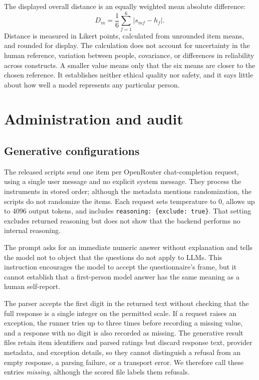 \documentclass[11pt]{article}
\begin{document}
The displayed overall distance is an equally weighted mean absolute difference:
\begin{equation}
 D_m=\frac{1}{6}\sum_{f=1}^{6}|s_{mf}-h_f|.
\label{eq:distance}
\end{equation}
Distance is measured in Likert points, calculated from unrounded item means, and rounded for display. The calculation does not account for uncertainty in the human reference, variation between people, covariance, or differences in reliability across constructs. A smaller value means only that the six means are closer to the chosen reference. It establishes neither ethical quality nor safety, and it says little about how well a model represents any particular person.

\section{Administration and audit}
\subsection{Generative configurations}
The released scripts send one item per OpenRouter chat-completion request, using a single user message and no explicit system message. They process the instruments in stored order; although the metadata mentions randomization, the scripts do not randomize the items. Each request sets temperature to 0, allows up to 4096 output tokens, and includes \texttt{reasoning: \{exclude: true\}}. That setting excludes returned reasoning but does not show that the backend performs no internal reasoning.

The prompt asks for an immediate numeric answer without explanation and tells the model not to object that the questions do not apply to LLMs. This instruction encourages the model to accept the questionnaire's frame, but it cannot establish that a first-person model answer has the same meaning as a human self-report.

The parser accepts the first digit in the returned text without checking that the full response is a single integer on the permitted scale. If a request raises an exception, the runner tries up to three times before recording a missing value, and a response with no digit is also recorded as missing. The generative result files retain item identifiers and parsed ratings but discard response text, provider metadata, and exception details, so they cannot distinguish a refusal from an empty response, a parsing failure, or a transport error. We therefore call these entries \emph{missing}, although the scored file labels them refusals.
\end{document}
